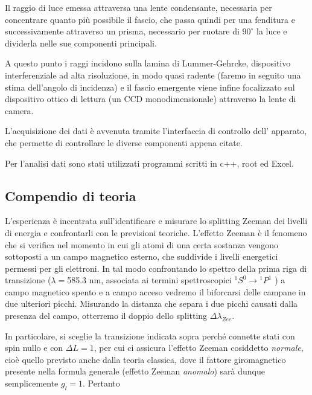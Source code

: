 \documentclass{article}
\begin{document}
	Il raggio di luce emessa attraversa una lente condensante, necessaria 
	per concentrare quanto più possibile il fascio, che passa quindi per una 
	fenditura e successivamente attraverso un prisma, necessario per ruotare di 
	$90 ^{\circ}$ la luce e dividerla nelle sue componenti principali. 
	
	A questo punto i raggi incidono sulla lamina di Lummer-Gehrcke, dispositivo
	interferenziale ad alta risoluzione, in modo quasi
	radente (faremo in seguito una stima dell'angolo di incidenza) e il fascio 
	emergente viene infine focalizzato sul dispositivo ottico di lettura (un CCD
	monodimensionale) attraverso la lente di camera.
	
	
	L'acquisizione dei dati è avvenuta tramite l'interfaccia di controllo dell'
	apparato, che permette di controllare le diverse componenti appena citate.
	
	Per l'analisi dati sono stati utilizzati programmi scritti in c++, root ed Excel.
	
	\subsection*{Compendio di teoria}
	
	L'esperienza è incentrata sull'identificare e misurare lo splitting 
	Zeeman dei livelli di energia e confrontarli con le previsioni teoriche.
	L'effetto Zeeman è il fenomeno che si verifica nel momento in cui gli
	atomi di una certa sostanza vengono sottoposti a un campo magnetico 
	esterno, che suddivide i livelli energetici permessi per gli elettroni.
	In tal modo confrontando lo spettro della prima riga di transizione 
	($\lambda = $585.3 nm, associata ai termini spettroscopici
	$^1S^0 \rightarrow {}^1P^1$ ) a campo magnetico spento e a campo 
	acceso vedremo 
	il biforcarsi delle campane in due ulteriori picchi. Misurando la
	distanza che separa i due picchi causati dalla presenza del campo,
	otterremo il doppio dello splitting $\Delta\lambda_{Zee} $.
	
	In particolare, si sceglie la transizione indicata sopra perché connette
	stati con spin nullo e con $\Delta L = 1$, per cui ci assicura l'effetto
	Zeeman cosiddetto \textit{normale}, cioè quello previsto anche dalla 
	teoria classica, dove il fattore giromagnetico presente nella formula 
	generale (effetto Zeeman \textit{anomalo}) sarà dunque semplicemente
	$g_l = 1$. Pertanto
	
\end{document}
